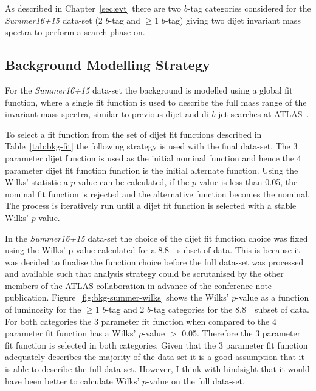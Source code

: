 As described in Chapter~\ref{sec:evt}
there are two $b$-tag categories considered for the \textit{Summer16+15} data-set 
(2 $b$-tag and $\geq1$ $b$-tag)
giving two dijet invariant mass spectra to perform a search phase on.

\subsection{Background Modelling Strategy}
\label{sec:bkg-summer_global}

For the \textit{Summer16+15} data-set the background is modelled using a global fit function,
where a single fit function is used to describe the full mass range of the invariant mass spectra,
similar to previous dijet and di-$b$-jet searches at ATLAS~\cite{dijet-mori16_paper,dibjet-mori16_paper}.

To select a fit function from the set of dijet fit functions described in Table~\ref{tab:bkg-fit} the following strategy is used with the final data-set.
The 3 parameter dijet function is used as the initial nominal function and hence the 4 parameter dijet fit function function is the initial alternate function.
Using the Wilks' statistic a $p$-value can be calculated,
if the $p$-value is less than 0.05, the nominal fit function is rejected and the alternative function becomes the nominal.
The process is iteratively run until a dijet fit function is selected with a stable Wilks' $p$-value.

In the \textit{Summer16+15} data-set the choice of the dijet fit function choice was fixed using the Wilks' p-value calculated for a 8.8~\ifb~subset of data.
This is because it was decided to finalise the function choice before the full data-set was processed and available
such that analysis strategy could be scrutanised by the other members of the ATLAS collaboration in advance of the conference note publication.
Figure~\ref{fig:bkg-summer-wilks} shows the Wilks' $p$-value as a function of luminosity
for the $\geq1$ $b$-tag and 2 $b$-tag categories for the 8.8~\ifb~subset of data.
For both categories the 3 parameter fit function when compared to the 4 parameter fit function
has a Wilks' $p$-value $>$ 0.05.
Therefore the 3 parameter fit function is selected in both categories.
Given that the 3 parameter fit function adequately describes the majority of the data-set it is a good assumption that it is able to describe the full data-set.
However, I think with hindsight that it would have been better to calculate Wilks' $p$-value on the full data-set.


